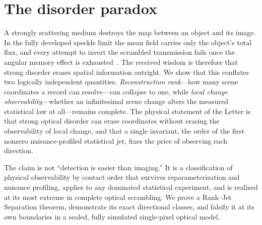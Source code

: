 \documentclass[aps,prl,reprint,groupedaddress,superscriptaddress,floatfix]{revtex4-2}
\begin{document}
\section*{The disorder paradox}
A strongly scattering medium destroys the map between an object and its image.
In the fully developed speckle limit the mean field carries only the object's
total flux, and every attempt to invert the scrambled transmission fails once
the angular memory effect is exhausted~\cite{FengMemory,Mudry}. The received
wisdom is therefore that strong disorder erases spatial information outright. We show that this conflates
two logically independent quantities. \emph{Reconstruction rank}---how many
scene coordinates a record can resolve---can collapse to one, while \emph{local
change observability}---whether an infinitesimal scene change alters the
measured statistical law at all---remains complete. The physical statement of
the Letter is that strong optical disorder can erase coordinates without erasing
the observability of local change, and that a single invariant, the order of the
first nonzero nuisance-profiled statistical jet, fixes the price of observing
each direction.

The claim is not ``detection is easier than imaging.'' It is a classification of
physical observability by contact order that survives reparameterization and
nuisance profiling, applies to any dominated statistical experiment, and is
realized at its most extreme in complete optical scrambling. We prove a
Rank--Jet Separation theorem, demonstrate its exact directional classes, and
falsify it at its own boundaries in a sealed, fully simulated single-pixel
optical model.

\end{document}
